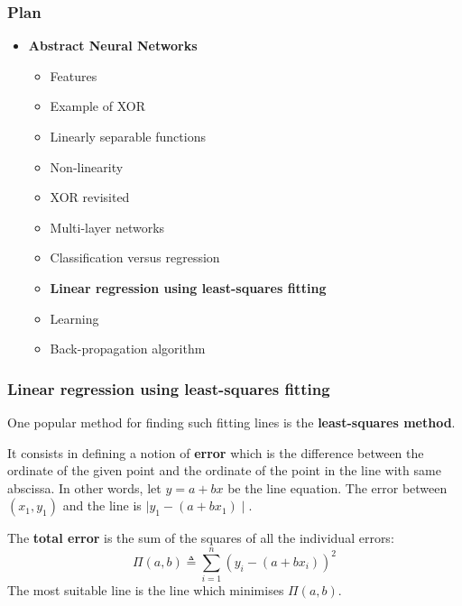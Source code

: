 %
\begin{frame}
\frametitle{Plan}

\begin{itemize}

  \item \textbf{Abstract Neural Networks}

  \begin{itemize}

    \item Features

    \item Example of XOR

    \item Linearly separable functions

    \item Non-linearity

    \item XOR revisited

    \item Multi-layer networks

    \item Classification versus regression

    \item \textbf{Linear regression using least-squares fitting}

    \item Learning

    \item Back-propagation algorithm

  \end{itemize}

\end{itemize}

\end{frame}

%
\begin{frame}
\frametitle{Linear regression using
  least-squares fitting}

One popular method for finding such fitting lines is the
\textbf{least-squares method}.

\bigskip

It consists in defining a notion of \textbf{error} which is the
difference between the ordinate of the given point and the ordinate of
the point in the line with same abscissa. In other words, let \(y = a
+ b x\) be the line equation. The error between \((x_1,y_1)\) and the
line is \(\mid{y_1} - (a + b x_1)\mid\).

\bigskip

The \textbf{total error} is the sum of the squares of all the
individual errors:
\[
  \Pi(a,b) \triangleq \sum_{i=1}^{n}{(y_i - (a + b x_i))^2}
\]
The most suitable line is the line which minimises \(\Pi(a,b)\).

\end{frame}

